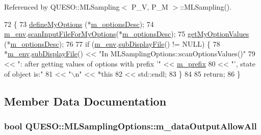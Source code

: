 Referenced by Q\-U\-E\-S\-O\-::\-M\-L\-Sampling$<$ P\-\_\-\-V, P\-\_\-\-M $>$\-::\-M\-L\-Sampling().


\begin{DoxyCode}
72 \{
73   \hyperlink{class_q_u_e_s_o_1_1_m_l_sampling_options_a36a5d0aab29603e955e3f942e5dc5cda}{defineMyOptions}                (*\hyperlink{class_q_u_e_s_o_1_1_m_l_sampling_options_afc13079420db3e2c7eaf97ca4d44cc97}{m\_optionsDesc});
74   \hyperlink{class_q_u_e_s_o_1_1_m_l_sampling_options_a28d73f222e9b20f1c749ed808f69eebd}{m\_env}.\hyperlink{class_q_u_e_s_o_1_1_base_environment_ae3e118fc38e17537107b347d6b421927}{scanInputFileForMyOptions}(*\hyperlink{class_q_u_e_s_o_1_1_m_l_sampling_options_afc13079420db3e2c7eaf97ca4d44cc97}{m\_optionsDesc});
75   \hyperlink{class_q_u_e_s_o_1_1_m_l_sampling_options_a209b2e0cf3fdaa85add4d04f8cf602a1}{getMyOptionValues}              (*\hyperlink{class_q_u_e_s_o_1_1_m_l_sampling_options_afc13079420db3e2c7eaf97ca4d44cc97}{m\_optionsDesc});
76 
77   \textcolor{keywordflow}{if} (\hyperlink{class_q_u_e_s_o_1_1_m_l_sampling_options_a28d73f222e9b20f1c749ed808f69eebd}{m\_env}.\hyperlink{class_q_u_e_s_o_1_1_base_environment_a8a0064746ae8dddfece4229b9ad374d6}{subDisplayFile}() != NULL) \{
78     *\hyperlink{class_q_u_e_s_o_1_1_m_l_sampling_options_a28d73f222e9b20f1c749ed808f69eebd}{m\_env}.\hyperlink{class_q_u_e_s_o_1_1_base_environment_a8a0064746ae8dddfece4229b9ad374d6}{subDisplayFile}() << \textcolor{stringliteral}{"In MLSamplingOptions::scanOptionsValues()"}
79                             << \textcolor{stringliteral}{": after getting values of options with prefix '"} << 
      \hyperlink{class_q_u_e_s_o_1_1_m_l_sampling_options_a1d3d48598e0b59b46337ce66a52671a5}{m\_prefix}
80                             << \textcolor{stringliteral}{"', state of object is:"}
81                             << \textcolor{stringliteral}{"\(\backslash\)n"} << *\textcolor{keyword}{this}
82                             << std::endl;
83   \}
84 
85   \textcolor{keywordflow}{return};
86 \}
\end{DoxyCode}


\subsection{Member Data Documentation}
\hypertarget{class_q_u_e_s_o_1_1_m_l_sampling_options_a530b32a42d38ca4112de8a06a2e760d3}{
\subsubsection[{m\-\_\-data\-Output\-Allow\-All}]{\setlength{\rightskip}{0pt plus 5cm}bool Q\-U\-E\-S\-O\-::\-M\-L\-Sampling\-Options\-::m\-\_\-data\-Output\-Allow\-All}}\label{class_q_u_e_s_o_1_1_m_l_sampling_options_a530b32a42d38ca4112de8a06a2e760d3}


